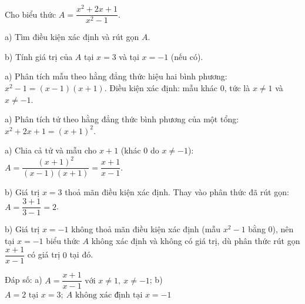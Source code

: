 \begin{problem}[8DS-PS-038]
Cho biểu thức $A = \dfrac{x^2 + 2x + 1}{x^2 - 1}$.

a) Tìm điều kiện xác định và rút gọn $A$.

b) Tính giá trị của $A$ tại $x = 3$ và tại $x = -1$ (nếu có).

\begin{solution}
a) Phân tích mẫu theo hằng đẳng thức hiệu hai bình phương: $x^2 - 1 = (x - 1)(x + 1)$. Điều kiện xác định: mẫu khác $0$, tức là $x \neq 1$ và $x \neq -1$.

a) Phân tích tử theo hằng đẳng thức bình phương của một tổng: $x^2 + 2x + 1 = (x + 1)^2$.

a) Chia cả tử và mẫu cho $x + 1$ (khác $0$ do $x \neq -1$): $A = \dfrac{(x + 1)^2}{(x - 1)(x + 1)} = \dfrac{x + 1}{x - 1}$.

b) Giá trị $x = 3$ thoả mãn điều kiện xác định. Thay vào phân thức đã rút gọn: $A = \dfrac{3 + 1}{3 - 1} = 2$.

b) Giá trị $x = -1$ không thoả mãn điều kiện xác định (mẫu $x^2 - 1$ bằng $0$), nên tại $x = -1$ biểu thức $A$ không xác định và không có giá trị, dù phân thức rút gọn $\dfrac{x + 1}{x - 1}$ có giá trị $0$ tại đó.

Đáp số: a) $\boxed{A = \dfrac{x + 1}{x - 1} \text{ với } x \neq 1,\ x \neq -1}$; b) $\boxed{A = 2 \text{ tại } x = 3;\ A \text{ không xác định tại } x = -1}$
\end{solution}
\end{problem}


